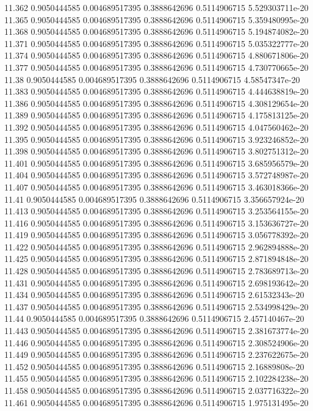 {11.362 0.9050444585 0.004689517395 0.3888642696 0.5114906715 5.529303711e-20
11.365 0.9050444585 0.004689517395 0.3888642696 0.5114906715 5.359480995e-20
11.368 0.9050444585 0.004689517395 0.3888642696 0.5114906715 5.194874082e-20
11.371 0.9050444585 0.004689517395 0.3888642696 0.5114906715 5.035322777e-20
11.374 0.9050444585 0.004689517395 0.3888642696 0.5114906715 4.880671806e-20
11.377 0.9050444585 0.004689517395 0.3888642696 0.5114906715 4.730770665e-20
11.38 0.9050444585 0.004689517395 0.3888642696 0.5114906715 4.58547347e-20
11.383 0.9050444585 0.004689517395 0.3888642696 0.5114906715 4.444638819e-20
11.386 0.9050444585 0.004689517395 0.3888642696 0.5114906715 4.308129654e-20
11.389 0.9050444585 0.004689517395 0.3888642696 0.5114906715 4.175813125e-20
11.392 0.9050444585 0.004689517395 0.3888642696 0.5114906715 4.047560462e-20
11.395 0.9050444585 0.004689517395 0.3888642696 0.5114906715 3.923246852e-20
11.398 0.9050444585 0.004689517395 0.3888642696 0.5114906715 3.802751312e-20
11.401 0.9050444585 0.004689517395 0.3888642696 0.5114906715 3.685956579e-20
11.404 0.9050444585 0.004689517395 0.3888642696 0.5114906715 3.572748987e-20
11.407 0.9050444585 0.004689517395 0.3888642696 0.5114906715 3.463018366e-20
11.41 0.9050444585 0.004689517395 0.3888642696 0.5114906715 3.356657924e-20
11.413 0.9050444585 0.004689517395 0.3888642696 0.5114906715 3.253564155e-20
11.416 0.9050444585 0.004689517395 0.3888642696 0.5114906715 3.153636727e-20
11.419 0.9050444585 0.004689517395 0.3888642696 0.5114906715 3.056778392e-20
11.422 0.9050444585 0.004689517395 0.3888642696 0.5114906715 2.962894888e-20
11.425 0.9050444585 0.004689517395 0.3888642696 0.5114906715 2.871894848e-20
11.428 0.9050444585 0.004689517395 0.3888642696 0.5114906715 2.783689713e-20
11.431 0.9050444585 0.004689517395 0.3888642696 0.5114906715 2.698193642e-20
11.434 0.9050444585 0.004689517395 0.3888642696 0.5114906715 2.61532343e-20
11.437 0.9050444585 0.004689517395 0.3888642696 0.5114906715 2.534998429e-20
11.44 0.9050444585 0.004689517395 0.3888642696 0.5114906715 2.457140467e-20
11.443 0.9050444585 0.004689517395 0.3888642696 0.5114906715 2.381673774e-20
11.446 0.9050444585 0.004689517395 0.3888642696 0.5114906715 2.308524906e-20
11.449 0.9050444585 0.004689517395 0.3888642696 0.5114906715 2.237622675e-20
11.452 0.9050444585 0.004689517395 0.3888642696 0.5114906715 2.16889808e-20
11.455 0.9050444585 0.004689517395 0.3888642696 0.5114906715 2.102284238e-20
11.458 0.9050444585 0.004689517395 0.3888642696 0.5114906715 2.037716322e-20
11.461 0.9050444585 0.004689517395 0.3888642696 0.5114906715 1.975131495e-20
}
